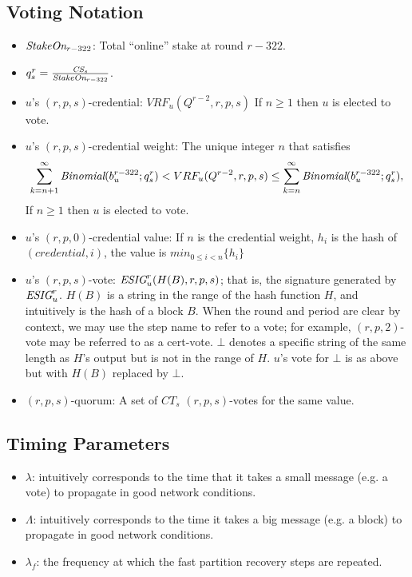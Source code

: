 \documentclass[../main.tex]{subfiles}
\begin{document}
\subsection{Voting Notation}
\begin{itemize}

\item $\textit{StakeOn}_{r-322}$: Total ``online'' stake at round $r-322$.

\item $q^r_s = \frac{\textit{CS}_s}{\textit{StakeOn}_{r-322}}$.

\item $u$'s $(r,p,s)$-credential: $VRF_u(Q^{r-2},r,p,s)$
If $n\geq 1$ then $u$ is elected to vote.

\item $u$'s $(r,p,s)$-credential weight: The unique integer $n$ that satisfies
\[
\sum_{k=n+1}^\infty \textit{Binomial}(b_u^{r-322};q^r_s) < VRF_u(Q^{r-2},r,p,s) \\ 
\leq \sum_{k=n}^\infty \textit{Binomial}(b_u^{r-322};q^r_s),
\]
If $n\geq 1$ then $u$ is elected to vote.
    
\item $u$'s $(r,p,0)$-credential value: If $n$ is the credential weight, $h_i$ is the hash of $(credential,i)$, the value is $min_{0\leq i < n}\{h_i\}$
    
\item $u$'s $(r,p,s)$-vote: $\textit{ESIG}_u^r(H(B),r,p,s)$; that is, the signature generated by $\textit{ESIG}_u^r$.
$H(B)$ is a string in the range of the hash function $H$, and intuitively is the hash of a block $B$.
When the round and period are clear by context, we may use the step name to refer to a vote; for example, $(r,p,2)$-vote may be referred to as a cert-vote.
$\bot$ denotes a specific string of the same length as $H$'s output but is not in the range of $H$. $u$'s vote for $\bot$ is as above but with $H(B)$ replaced by $\bot$.
    
\item $(r,p,s)$-quorum: A set of $CT_s$ $(r,p,s)$-votes for the same value.
\end{itemize}

\subsection{Timing Parameters}
\label{subsection:TimingParameters}

\begin{itemize}

\item $\lambda$: intuitively corresponds to the time that it takes a small message (e.g. a vote) to propagate in good network conditions.

\item $\Lambda$: intuitively corresponds to the time it takes a big message (e.g. a block) to propagate in good network conditions.

\item $\lambda_f$: the frequency at which the fast partition recovery steps are repeated.

\end{itemize}
\end{document}
